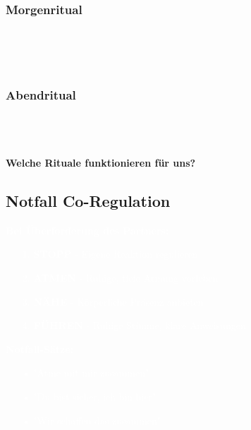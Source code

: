 \begin{ctmmOrangeBox}[title=Tägliche Verbindungsrituale]

\subsubsection{Morgenritual}
\\
\\
\\

\subsubsection{Abendritual}  
\\
\\
\\

\textbf{Welche Rituale funktionieren für uns?} \\

\end{ctmmOrangeBox}

\subsection{Notfall Co-Regulation}

\begin{ctmmRedBox}[title=\textcolor{white}{Akute Regulationshilfe}]

\textcolor{white}{\textbf{Bei Überforderung des Partners:}}

\begin{enumerate}
    \item[\textcolor{white}{1.}] \textcolor{white}{\textbf{STOPP} - Eigene Reaktion regulieren}
    \item[\textcolor{white}{2.}] \textcolor{white}{\textbf{ATMEN} - Ruhige, tiefe Atmung vorleben}
    \item[\textcolor{white}{3.}] \textcolor{white}{\textbf{NÄHE} - Körperliche Präsenz anbieten}
    \item[\textcolor{white}{4.}] \textcolor{white}{\textbf{FÜHREN} - Ruhige Stimme, klare Anweisungen}
\end{enumerate}

\textcolor{white}{\textbf{Notfall-Sätze:}}
\begin{itemize}
    \item[\textcolor{white}{•}] \textcolor{white}{"Atme mit mir zusammen"}
    \item[\textcolor{white}{•}] \textcolor{white}{"Du bist sicher, ich bin hier"}
    \item[\textcolor{white}{•}] \textcolor{white}{"Wir schaffen das zusammen"}
\end{itemize}

\end{ctmmRedBox}

